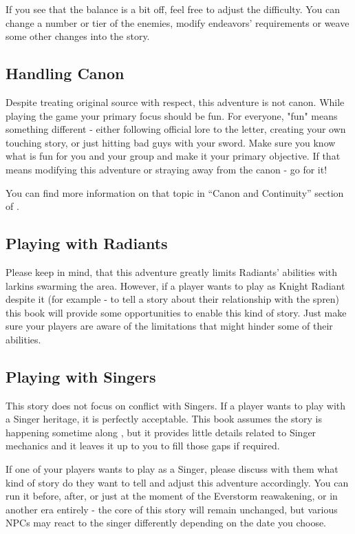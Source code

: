 If you see that the balance is a bit off, feel free to adjust the difficulty. You can change a number or tier of the enemies, modify endeavors' requirements or weave some other changes into the story.

\subsection{Handling Canon}

Despite treating original source with respect, this adventure is not canon. While playing the game your primary focus should be fun. For everyone, "fun" means something different - either following official lore to the letter, creating your own touching story, or just hitting bad guys with your sword. Make sure you know what is fun for you and your group and make it your primary objective. If that means modifying this adventure or straying away from the canon - go for it!

You can find more information on that topic in “Canon and Continuity” section of \handbook{}.

\subsection{Playing with Radiants}

Please keep in mind, that this adventure greatly limits Radiants' abilities with larkins swarming the area. However, if a player wants to play as Knight Radiant despite it (for example - to tell a story about their relationship with the spren) this book will provide some opportunities to enable this kind of story. Just make sure your players are aware of the limitations that might hinder some of their abilities.

\subsection{Playing with Singers}

This story does not focus on conflict with Singers. If a player wants to play with a Singer heritage, it is perfectly acceptable. This book assumes the story is happening sometime along \bookWOR{}, but it provides little details related to Singer mechanics and it leaves it up to you to fill those gaps if required.

If one of your players wants to play as a Singer, please discuss with them what kind of story do they want to tell and adjust this adventure accordingly. You can run it before, after, or just at the moment of the Everstorm reawakening, or in another era entirely - the core of this story will remain unchanged, but various NPCs may react to the singer differently depending on the date you choose.



